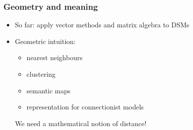 \begin{frame}
  \frametitle{Geometry and meaning}

  \begin{itemize}
  \item So far: apply vector methods and matrix algebra to DSMs
  \item Geometric intuition: 
    \begin{itemize}
    \item nearest neighbours
    \item clustering
    \item semantic maps
    \item representation for connectionist models
    \end{itemize}
  \itemhand We need a mathematical notion of distance!
  \end{itemize}
\end{frame}

